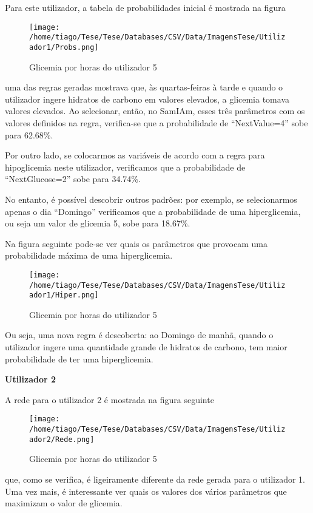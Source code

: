 Para este utilizador, a tabela de probabilidades inicial é mostrada na figura

\begin{figure}[H]
\centering
\texttt{[image: /home/tiago/Tese/Tese/Databases/CSV/Data/ImagensTese/Utilizador1/Probs.png]}
\caption{Glicemia por horas do utilizador 5}
\end{figure}

uma das regras geradas mostrava que, às quartas-feiras à tarde e quando o utilizador ingere hidratos de carbono em valores elevados, a glicemia tomava valores elevados. Ao selecionar, então, no SamIAm, esses três parâmetros com os valores definidos na regra, verifica-se que a probabilidade de ``Next\textunderscore Value=4'' sobe para 62.68\%.

Por outro lado, se colocarmos as variáveis de acordo com a regra para hipoglicemia neste utilizador, verificamos que a probabilidade de ``Next\textunderscore Glucose=2'' sobe para 34.74\%.

No entanto, é possível descobrir outros padrões: por exemplo, se selecionarmos apenas o dia ``Domingo'' verificamos que a probabilidade de uma hiperglicemia, ou seja um valor de glicemia 5, sobe para 18.67\%. 

Na figura seguinte pode-se ver quais os parâmetros que provocam uma probabilidade máxima de uma hiperglicemia.

\begin{figure}[H]
\centering
\texttt{[image: /home/tiago/Tese/Tese/Databases/CSV/Data/ImagensTese/Utilizador1/Hiper.png]}
\caption{Glicemia por horas do utilizador 5}
\end{figure}

Ou seja, uma nova regra é descoberta: ao Domingo de manhã, quando o utilizador ingere uma quantidade grande de hidratos de carbono, tem maior probabilidade de ter uma hiperglicemia. 

\textbf{Utilizador 2}


A rede para o utilizador 2 é mostrada na figura seguinte

\begin{figure}[H]
\centering
\texttt{[image: /home/tiago/Tese/Tese/Databases/CSV/Data/ImagensTese/Utilizador2/Rede.png]}
\caption{Glicemia por horas do utilizador 5}
\end{figure}

que, como se verifica, é ligeiramente diferente da rede gerada para o utilizador 1. Uma vez mais, é interessante ver quais os valores dos vários parâmetros que maximizam o valor de glicemia. 

